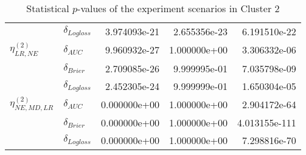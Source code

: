 \begin{table}[!h]
\begin{tabular}{l|lrrr}
                              & $\delta_{Logloss}$ &           3.974093e-21 &     2.655356e-23 &             6.191510e-22 \\
    $\eta^{(2)}_{LR, NE}$ & $\delta_{AUC}$ &           9.960932e-27 &     1.000000e+00 &             3.306332e-06 \\
                              & $\delta_{Brier}$ &           2.709085e-26 &     9.999995e-01 &             7.035798e-09 \\
                              & $\delta_{Logloss}$ &           2.452305e-24 &     9.999999e-01 &             1.650304e-05 \\
    $\eta^{(2)}_{NE, MD, LR}$ & $\delta_{AUC}$ &           0.000000e+00 &     1.000000e+00 &             2.904172e-64 \\
                              & $\delta_{Brier}$ &           0.000000e+00 &     1.000000e+00 &            4.013155e-111 \\
                              & $\delta_{Logloss}$ &           0.000000e+00 &     1.000000e+00 &             7.298816e-70 \\
    \bottomrule
    \end{tabular}
    \caption{Statistical $p$-values of the experiment scenarios in Cluster 2}
    \end{table}
    
